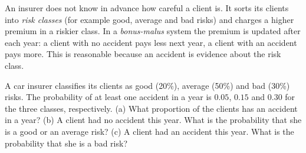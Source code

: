 
\begin{problem}
	\begin{context}
		An insurer does not know in advance how careful a client is. It sorts its
		clients into \emph{risk classes} (for example good, average and bad risks)
		and charges a higher premium in a riskier class. In a
		\emph{bonus-malus} system the premium is updated after each year: a client
		with no accident pays less next year, a client with an accident pays more.
		This is reasonable because an accident is evidence about the risk class.
	\end{context}
	A car insurer classifies its clients as good (20\%), average (50\%) and bad
	(30\%) risks. The probability of at least one accident in a year is $0.05$,
	$0.15$ and $0.30$ for the three classes, respectively.
	(a) What proportion of the clients has an accident in a year?
	(b) A client had no accident this year. What is the probability that she is
	a good or an average risk?
	(c) A client had an accident this year. What is the probability that she is
	a bad risk?
\end{problem}


